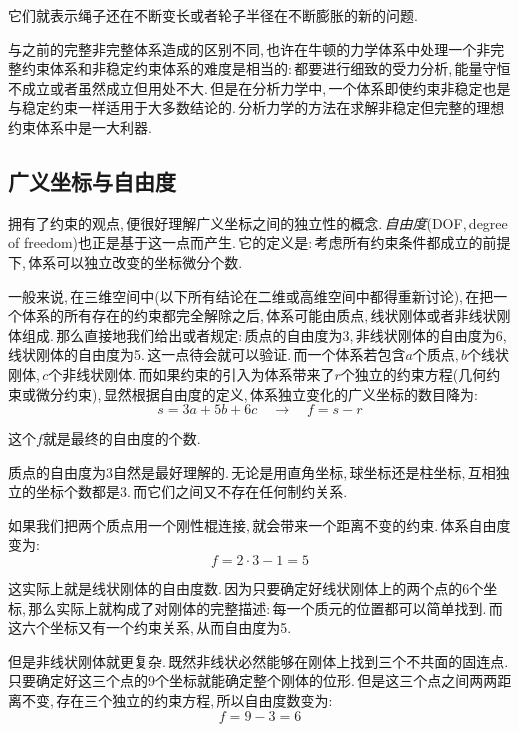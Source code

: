 它们就表示绳子还在不断变长或者轮子半径在不断膨胀的新的问题.

与之前的完整非完整体系造成的区别不同,\,也许在牛顿的力学体系中处理一个非完整约束体系和非稳定约束体系的难度是相当的:\,都要进行细致的受力分析,\,能量守恒不成立或者虽然成立但用处不大.\,但是在分析力学中,\,一个体系即使约束非稳定也是与稳定约束一样适用于大多数结论的.\,分析力学的方法在求解非稳定但完整的理想约束体系中是一大利器.

\subsection{广义坐标与自由度}

拥有了约束的观点,\,便很好理解广义坐标之间的独立性的概念.\,\emph{自由度}(DOF,\,degree of freedom)也正是基于这一点而产生.\,它的定义是:\,考虑所有约束条件都成立的前提下,\,体系可以独立改变的坐标微分个数.

一般来说,\,在三维空间中(以下所有结论在二维或高维空间中都得重新讨论),\,在把一个体系的所有存在的约束都完全解除之后,\,体系可能由质点,\,线状刚体或者非线状刚体组成.\,那么直接地我们给出或者规定:\,质点的自由度为3,\,非线状刚体的自由度为6,\,线状刚体的自由度为5.\,这一点待会就可以验证.\,而一个体系若包含$a$个质点,\,$b$个线状刚体,\,$c$个非线状刚体.\,而如果约束的引入为体系带来了$r$个独立的约束方程(几何约束或微分约束),\,显然根据自由度的定义,\,体系独立变化的广义坐标的数目降为:
\[s=3a+5b+6c\quad \longrightarrow \quad f=s-r\]

这个$f$就是最终的自由度的个数.

质点的自由度为3自然是最好理解的.\,无论是用直角坐标,\,球坐标还是柱坐标,\,互相独立的坐标个数都是3.\,而它们之间又不存在任何制约关系.

如果我们把两个质点用一个刚性棍连接,\,就会带来一个距离不变的约束.\,体系自由度变为:
\[f=2\cdot 3-1=5\]

这实际上就是线状刚体的自由度数.\,因为只要确定好线状刚体上的两个点的$6$个坐标,\,那么实际上就构成了对刚体的完整描述:\,每一个质元的位置都可以简单找到.\,而这六个坐标又有一个约束关系,\,从而自由度为5.

但是非线状刚体就更复杂.\,既然非线状必然能够在刚体上找到三个不共面的固连点.\,只要确定好这三个点的9个坐标就能确定整个刚体的位形.\,但是这三个点之间两两距离不变,\,存在三个独立的约束方程,\,所以自由度数变为:
\[f=9-3=6\]


